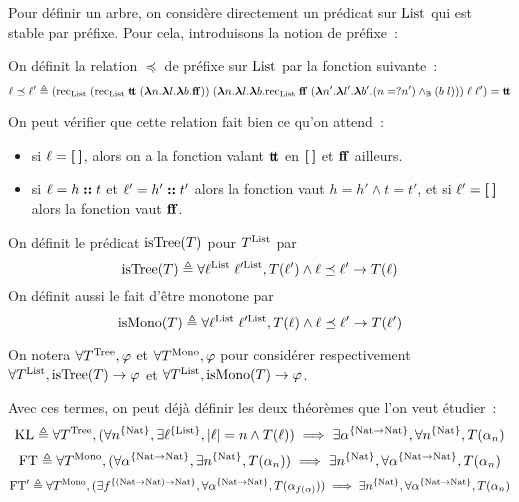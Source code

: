 \documentclass{article}
\begin{document}
Pour définir un arbre, on considère directement un prédicat sur $\mathrm{List}$ qui est stable par préfixe. Pour cela, introduisons la notion de préfixe~:

\begin{defi}[Préfixe]
  On définit la relation $\preceq$ de préfixe sur $\mathrm{List}$ par la fonction suivante~:
  \[\ell\preceq\ell' \triangleq (\mathrm{rec}_{\mathrm{List}}\;(\mathrm{rec}_{\mathrm{List}}\;\mathbf{t}\!\mathbf{t}\;(\boldsymbol{\lambda} n.\boldsymbol{\lambda} l. \boldsymbol{\lambda} b.\mathbf{f}\!\mathbf{f}))\;(\boldsymbol{\lambda} n.\boldsymbol{\lambda} l.\boldsymbol{\lambda} b.\mathrm{rec}_{\mathrm{List}}\;\mathbf{f}\!\mathbf{f}\;(\boldsymbol{\lambda} n'.\boldsymbol{\lambda} l'.\boldsymbol{\lambda} b'.(n =? n') \land_{\mathbb{B}} (b\;l)))\;\ell\;\ell') = \mathbf{t}\!\mathbf{t}\]
\end{defi}

On peut vérifier que cette relation fait bien ce qu'on attend~:
\begin{itemize}
\item si $\ell = \boldsymbol{ [ }\:\boldsymbol{ ] }$, alors on a la fonction valant $\mathbf{t}\!\mathbf{t}$ en $\boldsymbol{ [ }\:\boldsymbol{ ] }$ et $\mathbf{f}\!\mathbf{f}$ ailleurs.
\item si $\ell = h \boldsymbol{:}\boldsymbol{:} t$ et $\ell' = h' \boldsymbol{:}\boldsymbol{:} t'$ alors la fonction vaut $h = h' \land t = t'$, et si $\ell' = \boldsymbol{ [ }\:\boldsymbol{ ] }$ alors la fonction vaut $\mathbf{f}\!\mathbf{f}$.
\end{itemize}

\begin{defi}
  On définit le prédicat $\mathrm{isTree}(T)$ pour $T^{\mathrm{List}}$ par
  \[\mathrm{isTree}(T)\triangleq \forall \ell^{\mathrm{List}}\;\ell'^{\mathrm{List}}, T(\ell') \land \ell \preceq \ell' \to T(\ell)\]
  On définit aussi le fait d'être monotone par
  \[\mathrm{isMono}(T)\triangleq \forall \ell^{\mathrm{List}}\;\ell'^{\mathrm{List}}, T(\ell) \land \ell \preceq \ell' \to T(\ell')\]
\end{defi}

\begin{nota}
  On notera $\forall T^{\mathrm{Tree}}, \varphi$ et $\forall T^{\mathrm{Mono}}, \varphi$ pour considérer respectivement $\forall T^{\mathrm{List}}, \mathrm{isTree}(T) \to \varphi$ et $\forall T^{\mathrm{List}}, \mathrm{isMono}(T) \to \varphi$.
\end{nota}

Avec ces termes, on peut déjà définir les deux théorèmes que l'on veut étudier~:
\begin{equation}
  \mathrm{KL} \triangleq \forall T^{\mathrm{Tree}}, (\forall n^{\{\mathrm{Nat}\}}, \exists \ell^{\{\mathrm{List}\}}, |\ell| = n \land T(\ell)) \implies \exists \alpha^{\{\mathrm{Nat}\to\mathrm{Nat}\}}, \forall n^{\{\mathrm{Nat}\}}, T(\alpha_n)
\end{equation}
\begin{equation}
  \mathrm{FT} \triangleq \forall T^{\mathrm{Mono}}, (\forall \alpha^{\{\mathrm{Nat} \to \mathrm{Nat}\}},\exists n^{\{\mathrm{Nat}\}}, T(\alpha_n)) \implies \exists n^{\{\mathrm{Nat}\}}, \forall \alpha^{\{\mathrm{Nat} \to \mathrm{Nat}\}}, T(\alpha_n)
\end{equation}
\begin{equation}
  \mathrm{FT}' \triangleq \forall T^{\mathrm{Mono}}, (\exists f^{\{(\mathrm{Nat}\to\mathrm{Nat})\to\mathrm{Nat}\}}, \forall \alpha^{\{\mathrm{Nat} \to \mathrm{Nat}\}}, T(\alpha_{f(\alpha)})) \implies \exists n^{\{\mathrm{Nat}\}}, \forall \alpha^{\{\mathrm{Nat} \to \mathrm{Nat}\}}, T(\alpha_n)
\end{equation}
\end{document}
